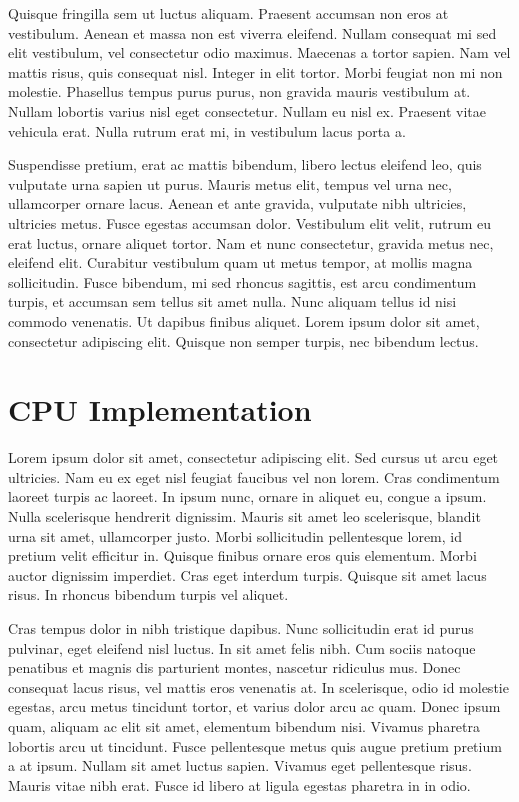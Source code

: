 \documentclass[a4paper,11pt]{kth-mag}
\begin{document}
Quisque fringilla sem ut luctus aliquam. Praesent accumsan non eros at vestibulum. Aenean et massa non est viverra eleifend. Nullam consequat mi sed elit vestibulum, vel consectetur odio maximus. Maecenas a tortor sapien. Nam vel mattis risus, quis consequat nisl. Integer in elit tortor. Morbi feugiat non mi non molestie. Phasellus tempus purus purus, non gravida mauris vestibulum at. Nullam lobortis varius nisl eget consectetur. Nullam eu nisl ex. Praesent vitae vehicula erat. Nulla rutrum erat mi, in vestibulum lacus porta a.

Suspendisse pretium, erat ac mattis bibendum, libero lectus eleifend leo, quis vulputate urna sapien ut purus. Mauris metus elit, tempus vel urna nec, ullamcorper ornare lacus. Aenean et ante gravida, vulputate nibh ultricies, ultricies metus. Fusce egestas accumsan dolor. Vestibulum elit velit, rutrum eu erat luctus, ornare aliquet tortor. Nam et nunc consectetur, gravida metus nec, eleifend elit. Curabitur vestibulum quam ut metus tempor, at mollis magna sollicitudin. Fusce bibendum, mi sed rhoncus sagittis, est arcu condimentum turpis, et accumsan sem tellus sit amet nulla. Nunc aliquam tellus id nisi commodo venenatis. Ut dapibus finibus aliquet. Lorem ipsum dolor sit amet, consectetur adipiscing elit. Quisque non semper turpis, nec bibendum lectus.

\chapter{CPU Implementation}



Lorem ipsum dolor sit amet, consectetur adipiscing elit. Sed cursus ut arcu eget ultricies. Nam eu ex eget nisl feugiat faucibus vel non lorem. Cras condimentum laoreet turpis ac laoreet. In ipsum nunc, ornare in aliquet eu, congue a ipsum. Nulla scelerisque hendrerit dignissim. Mauris sit amet leo scelerisque, blandit urna sit amet, ullamcorper justo. Morbi sollicitudin pellentesque lorem, id pretium velit efficitur in. Quisque finibus ornare eros quis elementum. Morbi auctor dignissim imperdiet. Cras eget interdum turpis. Quisque sit amet lacus risus. In rhoncus bibendum turpis vel aliquet.

Cras tempus dolor in nibh tristique dapibus. Nunc sollicitudin erat id purus pulvinar, eget eleifend nisl luctus. In sit amet felis nibh. Cum sociis natoque penatibus et magnis dis parturient montes, nascetur ridiculus mus. Donec consequat lacus risus, vel mattis eros venenatis at. In scelerisque, odio id molestie egestas, arcu metus tincidunt tortor, et varius dolor arcu ac quam. Donec ipsum quam, aliquam ac elit sit amet, elementum bibendum nisi. Vivamus pharetra lobortis arcu ut tincidunt. Fusce pellentesque metus quis augue pretium pretium a at ipsum. Nullam sit amet luctus sapien. Vivamus eget pellentesque risus. Mauris vitae nibh erat. Fusce id libero at ligula egestas pharetra in in odio.
\end{document}
